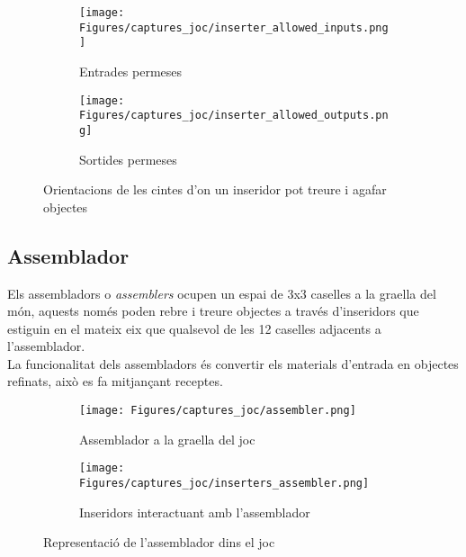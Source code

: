 \begin{figure}[h]
    \centering
    \begin{subfigure}{0.45\textwidth}
        \texttt{[image: Figures/captures\_joc/inserter\_allowed\_inputs.png]}
        \caption{Entrades permeses}
    \end{subfigure}
    \hfill
    \begin{subfigure}{0.45\textwidth}
        \texttt{[image: Figures/captures\_joc/inserter\_allowed\_outputs.png]}
        \caption{Sortides permeses}
    \end{subfigure}
    \caption{Orientacions de les cintes d'on un inseridor pot treure i agafar objectes}
    \label{fig:inserter_in_out}
\end{figure}

\subsection{Assemblador}
Els assembladors o \textit{assemblers} ocupen un espai de 3x3 caselles a la graella del món, aquests només poden rebre i treure objectes a través d'inseridors que estiguin en el mateix eix que qualsevol de les 12 caselles adjacents a l'assemblador.\\
La funcionalitat dels assembladors és convertir els materials d'entrada en objectes refinats, això es fa mitjançant receptes.

\begin{figure}[h]
    \centering
    \begin{subfigure}{0.45\textwidth}
        \texttt{[image: Figures/captures\_joc/assembler.png]}
        \caption{Assemblador a la graella del joc}
    \end{subfigure}
    \hfill
    \begin{subfigure}{0.45\textwidth}
        \texttt{[image: Figures/captures\_joc/inserters\_assembler.png]}
        \caption{Inseridors interactuant amb l'assemblador}
    \end{subfigure}
    \caption{Representació de l'assemblador dins el joc}
\end{figure}

